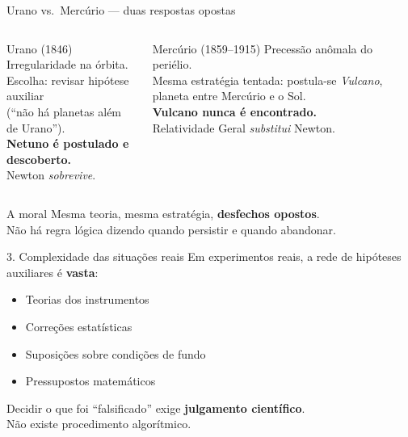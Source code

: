 \documentclass[aspectratio=169]{beamer}
\newcommand{\impt}[1]{\textcolor{maccent}{\textbf{#1}}}
\newcommand{\ntc}[1]{\textcolor{mprimary}{#1}}
\begin{document}
\begin{frame}{Urano vs.\ Mercúrio --- duas respostas opostas}
\begin{columns}[t]
\begin{block}{Urano (1846)}
Irregularidade na órbita.\\[0.15cm]
\ntc{Escolha:} revisar hipótese auxiliar \\ (``não há planetas além de Urano'').\\[0.15cm]
\impt{Netuno é postulado e descoberto.}\\[0.15cm]
Newton \emph{sobrevive}.
\end{block}

\pause
\begin{block}{Mercúrio (1859--1915)}
Precessão anômala do periélio.\\[0.15cm]
\ntc{Mesma estratégia tentada:} postula-se \emph{Vulcano}, planeta entre Mercúrio e o Sol.\\[0.15cm]
\impt{Vulcano nunca é encontrado.}\\[0.15cm]
Relatividade Geral \emph{substitui} Newton.
\end{block}
\end{columns}
\pause
\vspace{0.4cm}
\begin{alertblock}{A moral}
Mesma teoria, mesma estratégia, \impt{desfechos opostos}. \\
Não há regra lógica dizendo quando persistir e quando abandonar.
\end{alertblock}
\end{frame}

\begin{frame}{3. Complexidade das situações reais}
Em experimentos reais, a rede de hipóteses auxiliares é \impt{vasta}:
\vspace{0.3cm}
\pause
\begin{itemize}
  \item Teorias dos instrumentos
  \item Correções estatísticas
  \item Suposições sobre condições de fundo
  \item Pressupostos matemáticos
\end{itemize}
\pause
\vspace{0.5cm}
\begin{alertblock}{}
Decidir o que foi ``falsificado'' exige \impt{julgamento científico}. \\
Não existe procedimento algorítmico.
\end{alertblock}
\end{frame}
\end{document}
